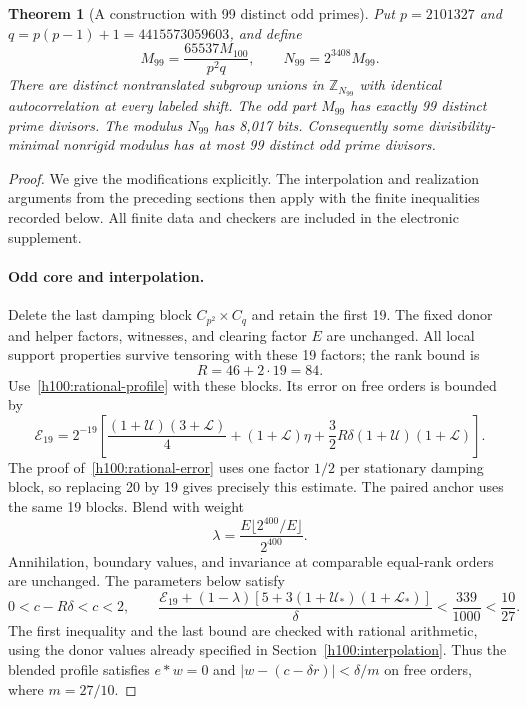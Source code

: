 \documentclass[11pt]{article}
\numberwithin{equation}{section}
\newtheorem{theorem}{Theorem}[section]
\theoremstyle{definition}
\theoremstyle{remark}
\begin{document}
\begin{theorem}[A construction with 99 distinct odd primes]
\label{v2:thm:h99}
Put $p=2101327$ and $q=p(p-1)+1=4415573059603$, and define
\[
 M_{99}=\frac{65537M_{100}}{p^2q},\qquad N_{99}=2^{3408}M_{99}.
\]
There are distinct nontranslated subgroup unions in $\mathbb Z_{N_{99}}$ with identical autocorrelation at every labeled shift. The odd part $M_{99}$ has exactly 99 distinct prime divisors. The modulus $N_{99}$ has 8,017 bits. Consequently some divisibility-minimal nonrigid modulus has at most 99 distinct odd prime divisors.
\end{theorem}
\begin{proof}
We give the modifications explicitly. The interpolation and realization arguments from the preceding sections then apply with the finite inequalities recorded below. All finite data and checkers are included in the electronic supplement.

\paragraph{Odd core and interpolation.}
Delete the last damping block $C_{p^2}\times C_q$ and retain the first 19. The fixed donor and helper factors, witnesses, and clearing factor $E$ are unchanged. All local support properties survive tensoring with these 19 factors; the rank bound is
\[
 R=46+2\cdot19=84.
\]
Use~\eqref{h100:rational-profile} with these blocks. Its error on free orders is bounded by
\begin{equation}\label{v2:eq:h99-error}
 \mathcal E_{19}=2^{-19}\left[
 \frac{(1+\mathcal U)(3+\mathcal L)}4+(1+\mathcal L)\eta
 +\frac32R\delta(1+\mathcal U)(1+\mathcal L)\right].
\end{equation}
The proof of~\eqref{h100:rational-error} uses one factor $1/2$ per stationary damping block, so replacing 20 by 19 gives precisely this estimate. The paired anchor uses the same 19 blocks. Blend with weight
\[
 \lambda=\frac{E\lfloor2^{400}/E\rfloor}{2^{400}}.
\]
Annihilation, boundary values, and invariance at comparable equal-rank orders are unchanged. The parameters below satisfy
\begin{equation}\label{v2:eq:h99-error-check}
 0<c-R\delta<c<2,\qquad
 \frac{\mathcal E_{19}+(1-\lambda)
 [5+3(1+\mathcal U_*)(1+\mathcal L_*)]}{\delta}
 <\frac{339}{1000}<\frac{10}{27}.
\end{equation}
The first inequality and the last bound are checked with rational arithmetic, using the donor values already specified in Section~\ref{h100:interpolation}. Thus the blended profile satisfies $e*w=0$ and
$|w-(c-\delta r)|<\delta/m$ on free orders, where $m=27/10$.


\end{proof}
\end{document}
